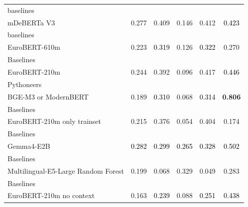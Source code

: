 \begin{tabularx}{\textwidth}{X | c c c c c}
baselines\\\subcatarrow{}mDeBERTa V3 & \textcolor{White!50!NavyBlue}{0.277} & \textcolor{White!50!BrickRed}{0.409} & \textcolor{White!50!NavyBlue}{0.146} & \textcolor{White!50!BrickRed}{0.412} & \textcolor{Black}{0.423} \\
baselines\\\subcatarrow{}EuroBERT-610m & \textcolor{White!50!NavyBlue}{0.223} & \textcolor{Black}{0.319} & \textcolor{White!50!NavyBlue}{0.126} & \textcolor{Black}{0.322} & \textcolor{White!50!NavyBlue}{0.270} \\
Baselines\\\subcatarrow{}EuroBERT-210m & \textcolor{White!50!NavyBlue}{0.244} & \textcolor{White!50!BrickRed}{0.392} & \textcolor{NavyBlue}{0.096} & \textcolor{White!50!BrickRed}{0.417} & \textcolor{Black}{0.446} \\
Pythoneers\\\subcatarrow{}BGE-M3 or ModernBERT & \textcolor{NavyBlue}{0.189} & \textcolor{Black}{0.310} & \textcolor{NavyBlue}{0.068} & \textcolor{Black}{0.314} & \textbf{\textcolor{BrickRed}{0.806}} \\
Baselines\\\subcatarrow{}EuroBERT-210m only trainset & \textcolor{White!50!NavyBlue}{0.215} & \textcolor{White!50!BrickRed}{0.376} & \textcolor{NavyBlue}{0.054} & \textcolor{White!50!BrickRed}{0.404} & \textcolor{NavyBlue}{0.174} \\
Baselines\\\subcatarrow{}Gemma4-E2B & \textcolor{Black}{0.282} & \textcolor{Black}{0.299} & \textcolor{Black}{0.265} & \textcolor{Black}{0.328} & \textcolor{Black}{0.502} \\
Baselines\\\subcatarrow{}Multilingual-E5-Large Random Forest & \textcolor{NavyBlue}{0.199} & \textcolor{NavyBlue}{0.068} & \textcolor{White!50!BrickRed}{0.329} & \textcolor{NavyBlue}{0.049} & \textcolor{White!50!NavyBlue}{0.283} \\
Baselines\\\subcatarrow{}EuroBERT-210m no context & \textcolor{NavyBlue}{0.163} & \textcolor{Black}{0.239} & \textcolor{NavyBlue}{0.088} & \textcolor{Black}{0.251} & \textcolor{Black}{0.438} \\
\hline
\end{tabularx}